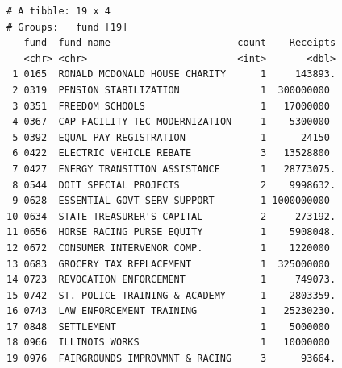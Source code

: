 \documentclass[
  letterpaper,
  DIV=11,
  numbers=noendperiod]{scrreport}
\begin{document}
\begin{verbatim}
# A tibble: 19 x 4
# Groups:   fund [19]
   fund  fund_name                      count    Receipts
   <chr> <chr>                          <int>       <dbl>
 1 0165  RONALD MCDONALD HOUSE CHARITY      1     143893.
 2 0319  PENSION STABILIZATION              1  300000000 
 3 0351  FREEDOM SCHOOLS                    1   17000000 
 4 0367  CAP FACILITY TEC MODERNIZATION     1    5300000 
 5 0392  EQUAL PAY REGISTRATION             1      24150 
 6 0422  ELECTRIC VEHICLE REBATE            3   13528800 
 7 0427  ENERGY TRANSITION ASSISTANCE       1   28773075.
 8 0544  DOIT SPECIAL PROJECTS              2    9998632.
 9 0628  ESSENTIAL GOVT SERV SUPPORT        1 1000000000 
10 0634  STATE TREASURER'S CAPITAL          2     273192.
11 0656  HORSE RACING PURSE EQUITY          1    5908048.
12 0672  CONSUMER INTERVENOR COMP.          1    1220000 
13 0683  GROCERY TAX REPLACEMENT            1  325000000 
14 0723  REVOCATION ENFORCEMENT             1     749073.
15 0742  ST. POLICE TRAINING & ACADEMY      1    2803359.
16 0743  LAW ENFORCEMENT TRAINING           1   25230230.
17 0848  SETTLEMENT                         1    5000000 
18 0966  ILLINOIS WORKS                     1   10000000 
19 0976  FAIRGROUNDS IMPROVMNT & RACING     3      93664.
\end{verbatim}
\end{document}
